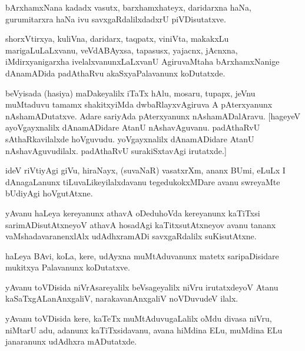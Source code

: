 \documentclass{article}
\begin{document}
\begin{mn}%
bArxhamxNana kadadx vasutx, barxhamxhateyx, daridarxna haNa, gurumitarxra haNa ivu 
savxgaRdalilxdadxrU piVDisutatxve.
\end{mn}

\begin{mn}%
shorxVtirxya, kuliVna, daridarx, taqpatx, viniVta, makakxLu marigaLuLaLxvanu, veVdABAyxsa, 
tapasusx, yajacnx, jAcnxna, iMdirxyanigarxha ivelalxvanunxLaLxvanU AgiruvaMtaha bArxhamxNanige 
dAnamADida padAthaRvu akaSxyaPalavanunx koDutatxde.
\end{mn}

\begin{mn}%
beVyisada (hasiya) maDakeyalilx iTaTx hAlu, mosaru, tupapx, jeVnu muMtaduvu tamamx shakitxyiMda 
dwbaRlayxvAgiruva A pAterxyanunx nAshamADutatxve. Adare sariyAda pAterxyanunx nAshamADalAravu. 
[hageyeV ayoVgayxnalilx dAnamADidare AtanU nAshavAguvanu. padAthaRvU sAthaRkavilalxde hoVguvudu. 
yoVgayxnalilx dAnamADidare AtanU nAshavAguvudilalx. padAthaRvU surakiSxtavAgi irutatxde.]
\end{mn}

\begin{mn}%
ideV riVtiyAgi giVu, hiraNayx, (suvaNaR) vasatxrXm, ananx BUmi, eLuLx I dAnagaLanunx 
tiLuvaLikeyilalxdavanu tegedukokxMDare avanu swreyaMte bUdiyAgi hoVgutAtxne.
\end{mn}

\begin{mn}%
yAvanu haLeya kereyanunx athavA oDeduhoVda kereyanunx kaTiTxsi sarimADisutAtxneyoV athavA hosadAgi 
kaTitxsutAtxneyov avanu tananx vaMshadavaranenxlAlx udAdhxramADi savxgaRdalilx suKisutAtxne.
\end{mn}

\begin{mn}%
haLeya BAvi, koLa, kere, udAyxna muMtAduvanunx matetx saripaDisidare mukitxya Palavanunx koDutatxve.
\end{mn}

\begin{mn}%
yAvanu toVDisida niVrAsareyalilx beVsageyalilx niVru irutatxdeyoV Atanu kaSaTxgALanAnxgaliV, 
narakavanAnxgaliV noVDuvudeV ilalx.
\end{mn}

\begin{mn}%
yAvanu toVDisida kere, kaTeTx muMtAduvugaLalilx oMdu divasa niVru, niMtarU adu, adanunx 
kaTiTxsidavanu, avana hiMdina ELu, muMdina ELu janaranunx udAdhxra  mADutatxde.
\end{mn}
\end{document}

